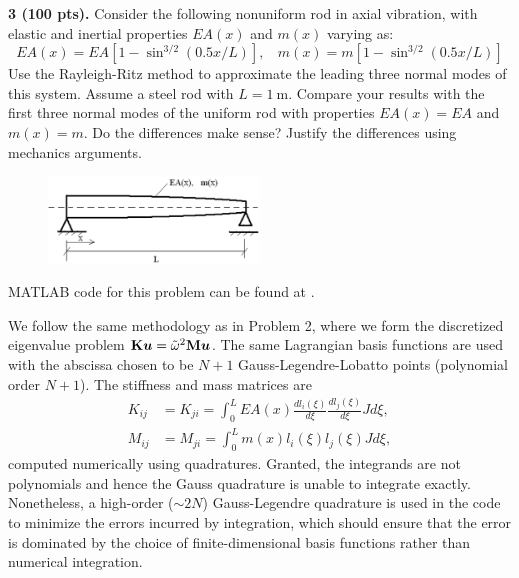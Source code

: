 \newpage
\begin{problem}
    \textbf{3 (100 pts).} Consider the following nonuniform rod in axial vibration, with elastic and inertial properties $EA(x)$ and $m(x)$ varying as:
    \begin{equation}
        EA(x) = EA\left[1 - \sin^{3/2}(0.5x/L) \right], ~~~~ m(x) = m\left[1 - \sin^{3/2}(0.5x/L) \right]
    \end{equation}
    Use the Rayleigh-Ritz method to approximate the leading three normal modes of this system.
    Assume a steel rod with $L=\qty{1}{\m}$. 
    Compare your results with the first three normal modes of the uniform rod with properties $EA(x) = EA$ and $m(x) = m$. 
    Do the differences make sense? 
    Justify the differences using mechanics arguments.  
\end{problem}
\begin{figure}[!ht]
    \centering
    \includegraphics[width=0.5\textwidth]{homework/hw3/assets/hw3_p3.png}
\end{figure}

MATLAB code for this problem can be found at .

We follow the same methodology as in Problem 2, where we form the discretized eigenvalue problem $\mathbf{K} \bm{u} = \tilde{\omega}^2 \mathbf{M} \bm{u}$. 
The same Lagrangian basis functions are used with the abscissa chosen to be $N + 1$ Gauss-Legendre-Lobatto points (polynomial order $N + 1$). 
The stiffness and mass matrices are 
\begin{equation}
\begin{aligned}
    K_{ij} &= K_{ji} = \int_0^L EA(x) \frac{dl_i(\xi)}{d\xi} \frac{dl_j(\xi)}{d\xi} J d\xi, \\
    M_{ij} &= M_{ji} = \int_0^L m(x) l_i(\xi) l_j(\xi) J d\xi,
\end{aligned}
\end{equation}
computed numerically using quadratures. 
Granted, the integrands are not polynomials and hence the Gauss quadrature is unable to integrate exactly. 
Nonetheless, a high-order ($\sim 2N$) Gauss-Legendre quadrature is used in the code to minimize the errors incurred by integration, which should ensure that the error is dominated by the choice of finite-dimensional basis functions rather than numerical integration. 


